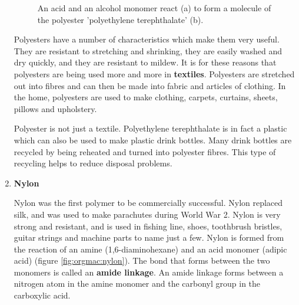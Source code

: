 \begin{enumerate}
{\begin{figure}[h]
\begin{center}
\caption{An acid and an alcohol monomer react (a) to form a molecule of the polyester 'polyethylene terephthalate' (b).}
\label{fig:orgmac:polyester2}
\end{center}
\end{figure}
}

Polyesters have a number of characteristics which make them very useful. They are resistant to stretching and shrinking, they are easily washed and dry quickly, and they are resistant to mildew. It is for these reasons that polyesters are being used more and more in \textbf{textiles}. Polyesters are stretched out into fibres and can then be made into fabric and articles of clothing. In the home, polyesters are used to make clothing, carpets, curtains, sheets, pillows and upholstery. 

\begin{IFact}{Polyester is not just a textile. Polyethylene terephthalate is in fact a plastic which can also be used to make plastic drink bottles. Many drink bottles are recycled by being reheated and turned into polyester fibres. This type of recycling helps to reduce disposal problems.}
\end{IFact}

\item{\textbf{Nylon}

Nylon was the first polymer to be commercially successful. Nylon replaced silk, and was used to make parachutes during World War 2. Nylon is very strong and resistant, and is used in fishing line, shoes, toothbrush bristles, guitar strings and machine parts to name just a few. Nylon is formed from the reaction of an amine (1,6-diaminohexane) and an acid monomer (adipic acid) (figure \ref{fig:orgmac:nylon}). The bond that forms between the two monomers is called an \textbf{amide linkage}. An amide linkage forms between a nitrogen atom in the amine monomer and the carbonyl group in the carboxylic acid.

}
\end{enumerate}
